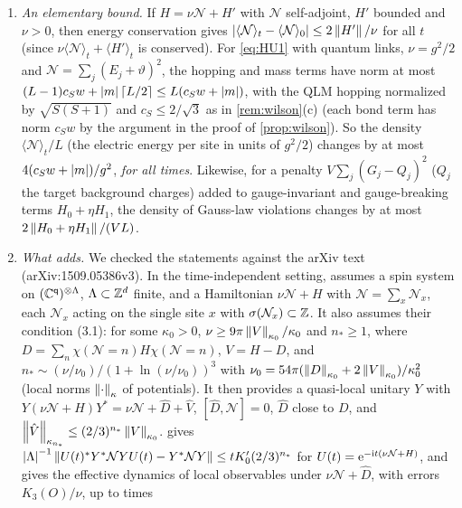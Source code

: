 \begin{remark}\label{rem:adhh}
\leavevmode
\begin{enumerate}[label=(\alph*)]
\item \emph{An elementary bound.}  If $H=\nu\mathcal N+H'$ with $\mathcal N$ self-adjoint, $H'$ bounded and
$\nu>0$, then energy conservation gives $\left|\langle\mathcal N\rangle_t-\langle\mathcal N\rangle_0\right|\le2\left\|H'\right\|/\nu$ for
all $t$ (since $\nu\langle\mathcal N\rangle_t+\langle H'\rangle_t$ is conserved).  For \eqref{eq:HU1} with quantum
links, $\nu=g^2/2$ and $\mathcal N=\sum_j(E_j+\vartheta)^2$, the hopping and mass terms have norm at most
$(L-1)c_Sw+\left|m\right|\lceil L/2\rceil\le L(c_Sw+\left|m\right|)$, with the QLM hopping normalized by $\sqrt{S(S+1)}$ and $c_S\le2/\sqrt3$
as in \cref{rem:wilson}(c) (each bond term has norm $c_Sw$ by the argument in the proof of \cref{prop:wilson}).  So the
density $\langle\mathcal N\rangle_t/L$ (the electric energy per site in units of $g^2/2$) changes by at most
$4(c_Sw+\left|m\right|)/g^2$, \emph{for all times}.  Likewise, for a penalty
$V\sum_j(G_j-Q_j)^2$ ($Q_j$ the target background charges) added to gauge-invariant and gauge-breaking terms
$H_0+\eta H_1$, the density of Gauss-law violations changes by at most $2\left\|H_0+\eta H_1\right\|/(VL)$.
\item \emph{What \cite{ADHH2017} adds.}  We checked the statements against the arXiv text (arXiv:1509.05386v3).
In the time-independent setting, \cite[Thm.~3.1]{ADHH2017} assumes a spin system on $(\mathbb{C}^{\mathsf q})^{\otimes\Lambda}$,
$\Lambda\subset\mathbb{Z}^d$ finite, and a Hamiltonian $\nu\mathcal N+H$ with $\mathcal N=\sum_x\mathcal N_x$, each $\mathcal N_x$ acting on
the single site $x$ with $\sigma(\mathcal N_x)\subset\mathbb{Z}$.  It also assumes their condition (3.1): for some $\kappa_0>0$,
$\nu\ge9\pi\left\|V\right\|_{\kappa_0}/\kappa_0$ and $n_*\ge1$, where $D=\sum_n\chi(\mathcal N=n)H\chi(\mathcal N=n)$, $V=H-D$, and
$n_*\sim(\nu/\nu_0)/(1+\ln(\nu/\nu_0))^3$ with $\nu_0=54\pi(\left\|D\right\|_{\kappa_0}+2\left\|V\right\|_{\kappa_0})/\kappa_0^2$ (local norms
$\left\|\cdot\right\|_\kappa$ of potentials).  It then provides a quasi-local unitary $Y$ with
$Y(\nu\mathcal N+H)Y^*=\nu\mathcal N+\hat D+\hat V$, $[\hat D,\mathcal N]=0$, $\hat D$ close to $D$, and
$\left\|\hat V\right\|_{\kappa_{n_*}}\le(2/3)^{n_*}\left\|V\right\|_{\kappa_0}$.  \cite[Thm.~3.2]{ADHH2017} gives
$\left|\Lambda\right|^{-1}\left\|U(t)^*Y^*\mathcal NYU(t)-Y^*\mathcal NY\right\|\le tK_0'(2/3)^{n_*}$ for
$U(t)=\mathrm{e}^{-\mathrm{i} t(\nu\mathcal N+H)}$, and \cite[Thm.~3.3]{ADHH2017}
gives the effective dynamics of local observables under $\nu\mathcal N+\hat D$, with errors $K_3(O)/\nu$, up to times

\end{enumerate}
\end{remark}
